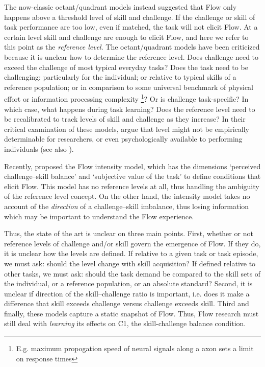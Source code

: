 \documentclass{frontierstyle/frontiersSCNS}
\newcommand{\hl}{\textcolor{red!80}}
\begin{document}
The now-classic octant/quadrant models \citep{Massimini1988} instead suggested that Flow only happens above a threshold level of skill and challenge. \hl{If the challenge or skill of task performance are too low, even if matched, the task will not elicit Flow. At a certain level skill and challenge are enough to elicit Flow, and here we refer to this point as the {\it reference level}.} The octant/quadrant models have been criticized because it is unclear how to determine the reference level. Does challenge need to exceed the challenge of most typical everyday tasks? Does the task need to be challenging: particularly for the individual; or relative to typical skills of a reference population; or in comparison to some universal benchmark of physical effort or information processing complexity \footnote{E.g. maximum propogation speed of neural signals along a axon sets a limit on response times}? Or is challenge task-specific? In which case, what happens during task learning? Does the reference level need to be recalibrated to track levels of skill and challenge as they increase? In their critical examination of these models, \cite{Keller2012} argue that level might not be empirically determinable for researchers, or even psychologically available to performing individuals (see also \cite{Moneta2012}).

\hl{Recently, \citet[pp-56]{Keller2012} proposed the Flow intensity model, which has the dimensions `perceived challenge--skill balance' and `subjective value of the task' to define conditions that elicit Flow. This model has no reference levels at all, thus handling the ambiguity of the reference level concept. On the other hand, the intensity model takes no account of the {\it direction} of a challenge--skill imbalance, thus losing information which may be important to understand the Flow experience.}

\hl{Thus, the state of the art is unclear on three main points. First, whether or not reference levels of challenge and/or skill govern the emergence of Flow. If they do, it is unclear how the levels are defined. If relative to a given task or task episode, we must ask: should the level change with skill acquisition? If defined relative to other tasks, we must ask: should the task demand be compared to the skill sets of the individual, or a reference population, or an absolute standard? Second, it is unclear if direction of the skill--challenge ratio is important, i.e. does it make a difference that skill exceeds challenge versus challenge exceeds skill. Third and finally, these models capture a static snapshot of Flow. Thus, Flow research must still deal with \textit{learning} its effects on {\sf C1}, the skill-challenge balance condition.}
\end{document}
